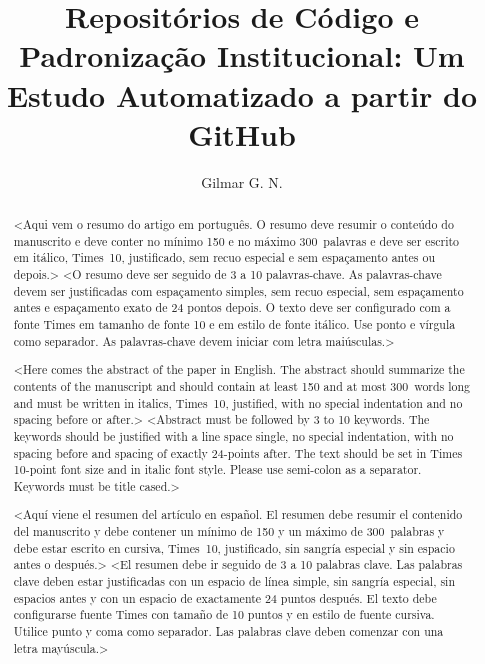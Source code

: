 \documentclass[english, spanish, brazilian]{RBIEarticle}
\title{Repositórios de Código e Padronização Institucional: Um Estudo Automatizado a partir do GitHub}
\author{Gilmar G. N.}
\begin{document}
	
	\maketitle
	
\begin{otherlanguage}{brazilian}
\begin{abstract}
<Aqui vem o resumo do artigo em português. O resumo deve resumir o conteúdo do manuscrito e deve conter no mínimo 150 e no máximo 300~palavras e deve ser escrito em itálico, Times~10, justificado, sem recuo especial e sem espaçamento antes ou depois.>
\keywords <O resumo deve ser seguido de 3 a 10 palavras-chave. As palavras-chave devem ser justificadas com espaçamento simples, sem recuo especial, sem espaçamento antes e espaçamento exato de 24 pontos depois. O texto deve ser configurado com a fonte Times em tamanho de fonte 10 e em estilo de fonte itálico. Use ponto e vírgula como separador. As palavras-chave devem iniciar com letra maiúsculas.>
\end{abstract}
\end{otherlanguage}

\begin{otherlanguage}{english}
\begin{abstract}
<Here comes the abstract of the paper in English. The abstract should summarize the contents of the manuscript and should contain at least 150 and at most 300~words long and must be written in italics, Times~10, justified, with no special indentation and no spacing before or after.>
\keywords <Abstract must be followed by 3 to 10 keywords. The keywords should be justified with a line space single, no special indentation, with no spacing before and spacing of exactly 24-points after. The text should be set in Times 10-point font size and in italic font style. Please use semi-colon as a separator. Keywords must be title cased.>
\end{abstract}
\end{otherlanguage}

\begin{otherlanguage}{spanish}
\begin{abstract}
<Aquí viene el resumen del artículo en español. El resumen debe resumir el contenido del manuscrito y debe contener un mínimo de 150 y un máximo de 300~palabras y debe estar escrito en cursiva, Times~10, justificado, sin sangría especial y sin espacio antes o después.>
\keywords <El resumen debe ir seguido de 3 a 10 palabras clave. Las palabras clave deben estar justificadas con un espacio de línea simple, sin sangría especial, sin espacios antes y con un espacio de exactamente 24 puntos después. El texto debe configurarse fuente Times con tamaño de 10 puntos y en estilo de fuente cursiva. Utilice punto y coma como separador. Las palabras clave deben comenzar con una letra mayúscula.>
\end{abstract}
\end{otherlanguage}
\end{document}
